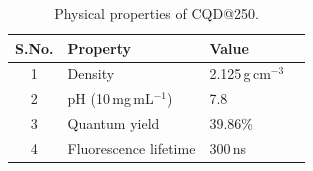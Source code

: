 \begin{table}[htbp]
  \centering
  \caption{Physical properties of CQD@250.}
  \label{tab:cqd_props}
  \begin{tabular}{clll}
    \hline
    \textbf{S.No.} & \textbf{Property} & \textbf{Value} \\
    \hline
    1 & Density            & 2.125\,g\,cm$^{-3}$ \\
    2 & pH (10\,mg\,mL$^{-1}$) & 7.8 \\
    3 & Quantum yield      & 39.86\% \\
    4 & Fluorescence lifetime & 300\,ns \\
    \hline
  \end{tabular}
\end{table}




